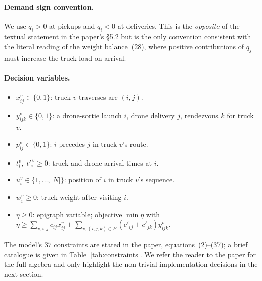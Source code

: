\documentclass[11pt,a4paper]{article}
\begin{document}
\paragraph{Demand sign convention.}
We use $q_i > 0$ at pickups and $q_i < 0$ at deliveries. This is the
\emph{opposite} of the textual statement in the paper's \S5.2 but is the
only convention consistent with the literal reading of the weight
balance~(28), where positive contributions of $q_j$ must increase the
truck load on arrival.

\paragraph{Decision variables.}
\begin{itemize}
\item $x^{v}_{ij}\in\{0,1\}$: truck $v$ traverses arc $(i,j)$.
\item $y^{v}_{ijk}\in\{0,1\}$: a drone-sortie launch $i$, drone delivery
$j$, rendezvous $k$ for truck $v$.
\item $p^{v}_{ij}\in\{0,1\}$: $i$ precedes $j$ in truck $v$'s route.
\item $t^{v}_{i},\;t'^{\,v}_{i}\ge 0$: truck and drone arrival times at $i$.
\item $u^{v}_{i}\in\{1,\dots,|N|\}$: position of $i$ in truck $v$'s
sequence.
\item $w^{v}_{i}\ge 0$: truck weight after visiting $i$.
\item $\eta\ge 0$: epigraph variable; objective $\min \eta$ with $\eta \ge
\sum_{v,i,j} c_{ij}x^{v}_{ij} + \sum_{v,(i,j,k)\in P}
(c'_{ij}{+}c'_{jk}) y^{v}_{ijk}$.
\end{itemize}

The model's $37$ constraints are stated in the paper, equations~(2)--(37); a
brief catalogue is given in Table~\ref{tab:constraints}. We refer the reader
to the paper for the full algebra and only highlight the non-trivial
implementation decisions in the next section.
\end{document}
